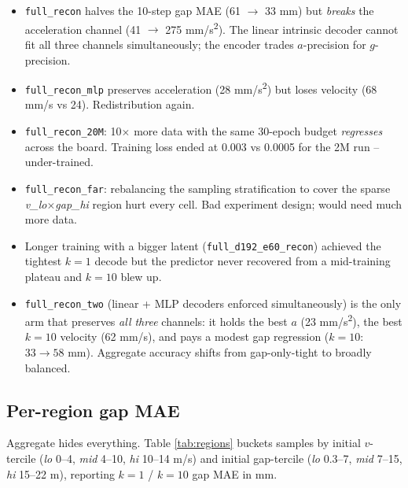 \documentclass[11pt,a4paper]{article}
\begin{document}
\begin{itemize}
\item \texttt{full\_recon} halves the 10-step gap MAE (61 $\to$ 33 mm) but
      \emph{breaks} the acceleration channel (41 $\to$ 275 mm/s\textsuperscript{2}).
      The linear intrinsic decoder cannot fit all three channels
      simultaneously; the encoder trades $a$-precision for $g$-precision.
\item \texttt{full\_recon\_mlp} preserves acceleration (28 mm/s\textsuperscript{2})
      but loses velocity (68 mm/s vs 24). Redistribution again.
\item \texttt{full\_recon\_20M}: 10$\times$ more data with the same 30-epoch
      budget \emph{regresses} across the board. Training loss ended at 0.003
      vs 0.0005 for the 2M run -- under-trained.
\item \texttt{full\_recon\_far}: rebalancing the sampling stratification to
      cover the sparse \emph{v\_lo}$\times$\emph{gap\_hi} region hurt every
      cell. Bad experiment design; would need much more data.
\item Longer training with a bigger latent (\texttt{full\_d192\_e60\_recon})
      achieved the tightest $k{=}1$ decode but the predictor never recovered
      from a mid-training plateau and $k{=}10$ blew up.
\item \texttt{full\_recon\_two} (linear + MLP decoders enforced
      simultaneously) is the only arm that preserves \emph{all three}
      channels: it holds the best $a$ (23 mm/s\textsuperscript{2}), the best
      $k{=}10$ velocity (62 mm/s), and pays a modest gap regression
      ($k{=}10$: $33 \to 58$ mm). Aggregate accuracy shifts from
      gap-only-tight to broadly balanced.
\end{itemize}

\subsection{Per-region gap MAE}

Aggregate hides everything. Table \ref{tab:regions} buckets samples by initial
$v$-tercile (\emph{lo} 0--4, \emph{mid} 4--10, \emph{hi} 10--14 m/s) and
initial gap-tercile (\emph{lo} 0.3--7, \emph{mid} 7--15, \emph{hi} 15--22 m),
reporting $k{=}1$ / $k{=}10$ gap MAE in mm.
\end{document}
